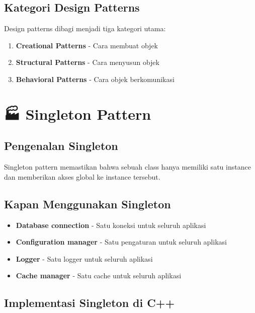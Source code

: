 \subsection{Kategori Design Patterns}

Design patterns dibagi menjadi tiga kategori utama:

\begin{enumerate}
\item \textbf{Creational Patterns} - Cara membuat objek
\item \textbf{Structural Patterns} - Cara menyusun objek
\item \textbf{Behavioral Patterns} - Cara objek berkomunikasi
\end{enumerate}

\section{🏭 Singleton Pattern}

\subsection{Pengenalan Singleton}

Singleton pattern memastikan bahwa sebuah class hanya memiliki satu instance dan memberikan akses global ke instance tersebut.

\subsection{Kapan Menggunakan Singleton}

\begin{itemize}
\item \textbf{Database connection} - Satu koneksi untuk seluruh aplikasi
\item \textbf{Configuration manager} - Satu pengaturan untuk seluruh aplikasi
\item \textbf{Logger} - Satu logger untuk seluruh aplikasi
\item \textbf{Cache manager} - Satu cache untuk seluruh aplikasi
\end{itemize}

\subsection{Implementasi Singleton di C++}

